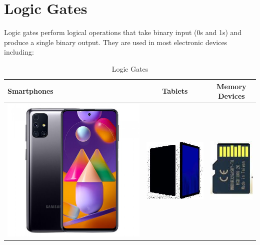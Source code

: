 \documentclass{article}
\begin{document}
		
		\section{Logic Gates}
		Logic gates perform logical operations that take binary input (0s and 1s) and produce a single binary output. They are used in most electronic devices including:
		
		\begin{table}[h!]
			\begin{center}
				\caption{Logic Gates}
				\label{tan:table1}
				\begin{tabular}{|l|c|c|}
					\hline
					Smartphones
					&
					Tablets
					&
					Memory Devices
					\\
				\hline
				\includegraphics[width=0.2\linewidth]{picture1.jpg}
				&
				\includegraphics[width=0.25\linewidth]{picture2.jpg}
				&
				\includegraphics[width=0.2\linewidth]{picture3.jpg}
				\\
					\hline
				\end{tabular}
			\end{center}
		\end{table}
	
\end{document}
